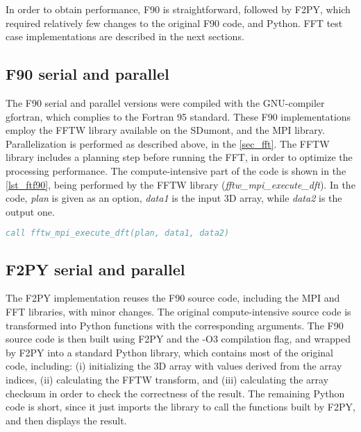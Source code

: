 In order to obtain performance, F90 is straightforward, followed by F2PY, which required relatively few changes to the original F90 code, and Python. FFT test case implementations are described in the next sections.

%
%
%
\subsection{F90 serial and parallel} %
\label{sec_fftimplf90}

The F90 serial and parallel versions were compiled with the GNU-compiler gfortran, which complies to the Fortran 95 standard. These F90 implementations employ the FFTW library available on the SDumont, and the MPI library. Parallelization is performed as described above, in the \autoref {sec_fft}. The FFTW library includes a planning step before running the FFT, in order to optimize the processing performance. The compute-intensive part of the code is shown in the \autoref {lst_ftf90}, being performed by the FFTW library (\textit {fftw\_mpi\_execute\_dft}). In the code, \textit {plan} is given as an option, \textit {data1} is the input 3D array, while \textit {data2} is the output one.

\begin{lstlisting}[float=hbt, language=Fortran, label={lst_ftf90}, caption={compute-intensive part of the FFT test case F90 code.}]
call fftw_mpi_execute_dft(plan, data1, data2)
\end{lstlisting}

%
%
%
\subsection{F2PY serial and parallel} %
\label{sec_fftimplf2py}

The F2PY implementation reuses the F90 source code, including the MPI and FFT libraries, with minor changes. The original compute-intensive source code is transformed into Python functions with the corresponding arguments. The F90 source code is then built using F2PY and the -O3 compilation flag, and wrapped by F2PY into a standard Python library, which contains most of the original code, including: 
(i) initializing the 3D array with values derived from the array indices, 
(ii) calculating the FFTW transform, and 
(iii) calculating the array checksum in order to check the correctness of the result. 
The remaining Python code is short, since it just imports the library to call the functions built by F2PY, and then displays the result. 

